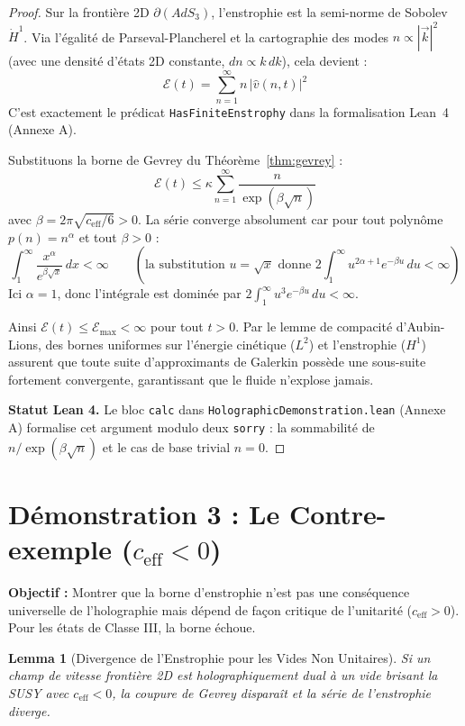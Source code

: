 \documentclass[11pt,twoside,openright]{book}
\newtheorem{lemma}[theorem]{Lemma}
\begin{document}
\begin{proof}
Sur la frontière 2D $\partial(AdS_3)$, l'enstrophie est la semi-norme de Sobolev $\dot{H}^1$. Via l'égalité de Parseval-Plancherel et la cartographie des modes $n \propto |\vec{k}|^2$ (avec une densité d'états 2D constante, $dn \propto k\,dk$), cela devient :
\[ \mathcal{E}(t) = \sum_{n=1}^{\infty} n\, |\hat{v}(n,t)|^2 \]
C'est exactement le prédicat \texttt{HasFiniteEnstrophy} dans la formalisation Lean~4 (Annexe A).

Substituons la borne de Gevrey du Théorème~\ref{thm:gevrey} :
\[ \mathcal{E}(t) \le \kappa \sum_{n=1}^{\infty} \frac{n}{\exp(\beta\sqrt{n})} \]
avec $\beta = 2\pi\sqrt{c_{\text{eff}}/6} > 0$. La série converge absolument car pour tout polynôme $p(n) = n^\alpha$ et tout $\beta > 0$ :
\[ \int_1^\infty \frac{x^\alpha}{e^{\beta\sqrt{x}}}\, dx < \infty \qquad (\text{la substitution } u = \sqrt{x} \text{ donne } 2\int_1^\infty u^{2\alpha+1} e^{-\beta u}\, du < \infty) \]
Ici $\alpha = 1$, donc l'intégrale est dominée par $2\int_1^\infty u^3 e^{-\beta u}\, du < \infty$.

Ainsi $\mathcal{E}(t) \le \mathcal{E}_{\max} < \infty$ pour tout $t > 0$. Par le lemme de compacité d'Aubin-Lions, des bornes uniformes sur l'énergie cinétique ($L^2$) et l'enstrophie ($H^1$) assurent que toute suite d'approximants de Galerkin possède une sous-suite fortement convergente, garantissant que le fluide n'explose jamais.

\textbf{Statut Lean 4.} Le bloc \texttt{calc} dans \texttt{HolographicDemonstration.lean} (Annexe A) formalise cet argument modulo deux \texttt{sorry} : la sommabilité de $n/\exp(\beta\sqrt{n})$ et le cas de base trivial $n=0$.
\end{proof}

\section{Démonstration 3 : Le Contre-exemple ($c_{\text{eff}} < 0$)}

\textbf{Objectif :} Montrer que la borne d'enstrophie n'est pas une conséquence universelle de l'holographie mais dépend de façon critique de l'unitarité ($c_{\text{eff}} > 0$). Pour les états de Classe III, la borne échoue.

\begin{lemma}[Divergence de l'Enstrophie pour les Vides Non Unitaires]\label{lem:blowup}
Si un champ de vitesse frontière 2D est holographiquement dual à un vide brisant la SUSY avec $c_{\text{eff}} < 0$, la coupure de Gevrey disparaît et la série de l'enstrophie diverge.
\end{lemma}
\end{document}
